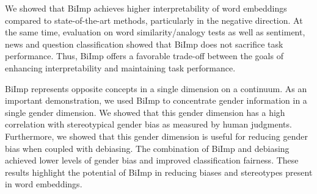 \documentclass[11pt,a4paper]{article}
\def\proposedmethod{BiImp}
\begin{document}
We showed that  \proposedmethod{}
achieves higher interpretability of word embeddings compared to
state-of-the-art methods, particularly in the negative
direction. At the same time, evaluation on word
similarity/analogy tests as well as sentiment, news and
question classification  showed that \proposedmethod{} does
not sacrifice task performance.
Thus, \proposedmethod{} offers a favorable
trade-off between the goals of enhancing
interpretability and maintaining task performance.




\proposedmethod{} represents opposite concepts in a single
dimension on a continuum. As an important demonstration, we
used \proposedmethod{} to concentrate gender information in
a single gender dimension.  We showed that this gender
dimension has a high correlation with stereotypical gender
bias as measured by human judgments. Furthermore, we showed
that this gender dimension is useful for reducing gender
bias when coupled with debiasing.  The combination of
\proposedmethod{} and debiasing achieved lower levels of
gender bias and improved classification fairness. These
results highlight the potential of \proposedmethod{} in
reducing biases and stereotypes present in word embeddings.








\end{document}
